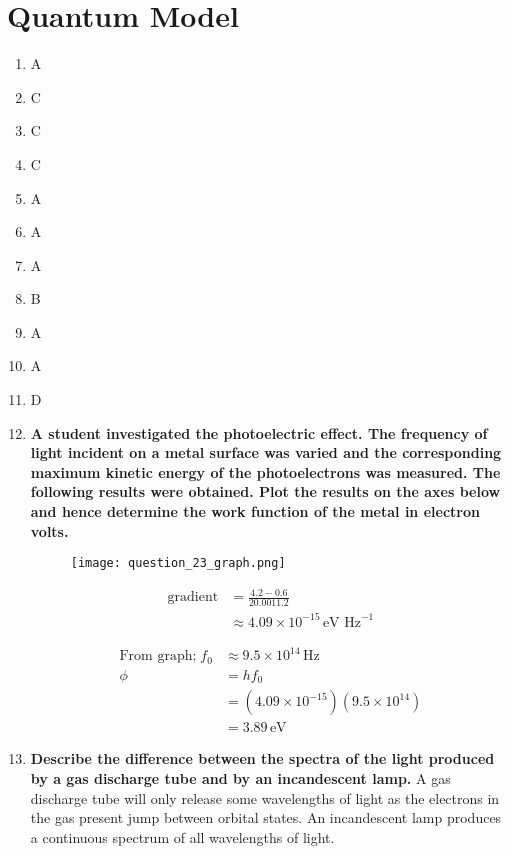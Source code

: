 \documentclass{report}
\begin{document}
	\section{Quantum Model}
	
		\begin{enumerate}
			\item A
			\item C
			\item C
			\item C
			\item A
			\item A
			\item A
			\item B
			\item A
			\item A
			\item D
			\item \textbf{A student investigated the photoelectric effect. The frequency of light incident on a metal surface was varied and the corresponding maximum kinetic energy of the photoelectrons was measured. The following results were obtained. Plot the results on the axes below and hence determine the work function of the metal in electron volts.}

				\begin{figure}[H]
					\centering
					\texttt{[image: question\_23\_graph.png]}
				\end{figure}

				\begin{align*}
					\text{gradient} &= \frac{4.2 - 0.6}{20.0 0 11.2} \\
							&\approx 4.09 \times 10^{-15} \, \text{eV Hz}^{-1}
				\end{align*}

				\begin{align*}
					\text{From graph;} \; f_0 &\approx 9.5 \times 10^{14} \, \text{Hz} \\
					\phi &= h f_0 \\
					     &= (4.09 \times 10^{-15})(9.5 \times 10^{14}) \\
					     &= 3.89 \, \text{eV}
				\end{align*}

			\item \textbf{Describe the difference between the spectra of the light produced by a gas discharge tube and by an incandescent lamp.}
				\subitem A gas discharge tube will only release some wavelengths of light as the electrons in the gas present jump between orbital states. An incandescent lamp produces a continuous spectrum of all wavelengths of light.



\end{enumerate}
\end{document}
